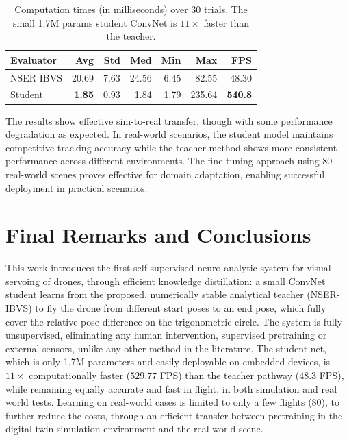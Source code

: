 \documentclass[10pt,twocolumn,letterpaper]{article}
\begin{document}
\begin{table}[t]
\centering
\footnotesize
\caption{Computation times (in milliseconds)
over 30 trials. The small 1.7M params student ConvNet is $11\times$ faster than the teacher.}
\label{tab:nn-timing-eval}
\begin{tabular}{lrrrrrr}
\toprule
\textbf{Evaluator} & \textbf{Avg} & \textbf{Std} & \textbf{Med} & \textbf{Min} & \textbf{Max} & \textbf{FPS} \\
\midrule
NSER IBVS & 20.69 & 7.63 & 24.56 & 6.45 & 82.55 & 48.30 \\
Student  & \textbf{1.85} & 0.93 & 1.84 & 1.79 & 235.64 & \textbf{540.8} \\
\bottomrule
\end{tabular}
\end{table}

The results show effective sim-to-real transfer, though with some performance degradation as expected. In real-world scenarios, the student model maintains competitive tracking accuracy while the teacher method shows more consistent performance across different environments. The fine-tuning approach using 80 real-world scenes proves effective for domain adaptation, enabling successful deployment in practical scenarios.

\section{Final Remarks and Conclusions}
\label{sec:conclusion}
This work introduces the first self-supervised neuro-analytic system for visual servoing of drones, through efficient knowledge distillation: a small ConvNet student learns from the proposed, numerically stable analytical teacher (NSER-IBVS) to fly the drone from different start poses to an end pose, which fully cover the relative pose difference on the trigonometric circle. The system is fully unsupervised, eliminating any human intervention, supervised pretraining or external sensors, unlike any other method in the literature. The student net, which is only 1.7M parameters and easily deployable on embedded devices, is $11\times$ computationally faster ($529.77$ FPS) than the teacher pathway ($48.3$ FPS), while remaining equally accurate and fast in flight, in both simulation and real world tests. Learning on real-world cases is limited to only a few flights ($80$), to further reduce the costs, through an efficient transfer between pretraining in the digital twin simulation environment and the real-world scene.
\end{document}
